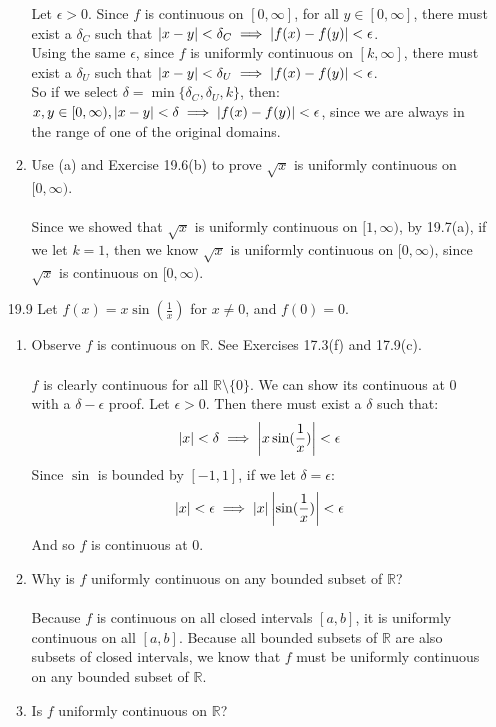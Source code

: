 \begin{enumerate}
\begin{enumerate}
        Let $\epsilon > 0$. Since $f$ is continuous on $[0,\infty]$, for all $y \in [0,\infty]$, there must exist a $\delta_C$ such that $\left\vert x-y \right\vert < \delta_C \implies \left\vert f(x) - f(y) \right\vert < \epsilon$.\\

        Using the same $\epsilon$, since $f$ is uniformly continuous on $[k,\infty]$, there must exist a $\delta_U$ such that $\left\vert x-y \right\vert < \delta_U \implies \left\vert f(x) - f(y) \right\vert < \epsilon$.\\

        So if we select $\delta = \min \{\delta_C, \delta_U, k \}$, then:
        $x,y \in [0,\infty), \left\vert x-y \right\vert < \delta \implies \left\vert f(x) - f(y) \right\vert < \epsilon$, since we are always in the range of one of the original domains.
      \item Use (a) and Exercise 19.6(b) to prove $\sqrt{x}$ is uniformly continuous on $[0,\infty)$.\\\\
        
        Since we showed that $\sqrt{x}$ is uniformly continuous on $[1,\infty)$, by 19.7(a), if we let $k=1$, then we know $\sqrt{x}$ is uniformly continuous on $[0,\infty)$, since $\sqrt{x}$ is continuous on $[0,\infty)$.
    \end{enumerate}
  \item [19.9]
    Let $f(x) = x \sin(\frac{1}{x})$ for $x \neq 0$, and $f(0) = 0$.
    \begin{enumerate}
      \item Observe $f$ is continuous on $\mathds{R}$. See Exercises 17.3(f) and 17.9(c).\\\\

        $f$ is clearly continuous for all $\mathds{R} \setminus \{0\}$. We can show its continuous at $0$ with a $\delta-\epsilon$ proof. Let $\epsilon > 0$. Then there must exist a $\delta$ such that:
        $$\left\vert x \right\vert < \delta \implies \left\vert x \sin(\frac{1}{x}) \right\vert < \epsilon$$
        Since $\sin$ is bounded by $[-1,1]$, if we let $\delta = \epsilon$:
        $$\left\vert x \right\vert < \epsilon \implies \left\vert x \right\vert \left\vert \sin(\frac{1}{x}) \right\vert < \epsilon$$
        And so $f$ is continuous at $0$.
      \item Why is $f$ uniformly continuous on any bounded subset of $\mathds{R}$?\\\\

        Because $f$ is continuous on all closed intervals $[a,b]$, it is uniformly continuous on all $[a,b]$. Because all bounded subsets of $\mathds{R}$ are also subsets of closed intervals, we know that $f$ must be uniformly continuous on any bounded subset of $\mathds{R}$.
      \item Is $f$ uniformly continuous on $\mathds{R}$?\\\\


\end{enumerate}
\end{enumerate}
